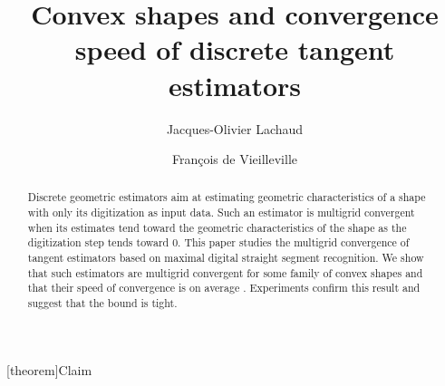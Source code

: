 \documentclass{llncs}
\begin{document}
\pagestyle{empty}

\mainmatter

\title{Convex shapes and convergence speed of discrete tangent estimators}

\author{Jacques-Olivier Lachaud  \and Fran\c{c}ois de Vieilleville}










\maketitle

\newcommand{\BigO}[1]{\ensuremath{ \mathcal{O}( #1 )}}
\newcommand{\DG}[0]{\ensuremath{\mathrm{Dig}}}
\newcommand{\Dig}[1]{\ensuremath{\DG_{#1}}}
\newcommand{\GDig}[1]{\ensuremath{\mathrm{D}^G_{#1}}}
\newcommand{\SF}[0]{\ensuremath{\mathbb{F}}}
\newcommand{\GQ}[0]{\ensuremath{G}} \newcommand{\DE}[1]{\ensuremath{\mathcal{#1}}} \newcommand{\Cite}[1]{\cite{#1}}
\newcommand{\CSF}[0]{\ensuremath{\mathbb{F}_{c}^3}}
\newcommand{\CSFM}[0]{\ensuremath{\mathbb{F}_{c}^3(M)}}
\newcommand{\Z}[0]{\ensuremath{\mathbb{Z}}}

\newcommand{\refClaim}[1]{Claim~\ref{#1}}
[theorem]{Claim}{\bfseries}{\itshape}

\newcommand{\TANEDGE}[1]{\ensuremath{\mathcal{T}^\mathrm{edge}_M}}
\newcommand{\TANMS}[1]{\ensuremath{\mathcal{T}^\mathrm{ms}_M}}

\begin{abstract}
  Discrete geometric estimators aim at estimating geometric
  characteristics of a shape with only its digitization as input data.
  Such an estimator is multigrid convergent when its estimates tend
  toward the geometric characteristics of the shape as the
  digitization step  tends toward 0.  This paper studies the
  multigrid convergence of tangent estimators based on maximal digital
  straight segment recognition. We show that such estimators are
  multigrid convergent for some family of convex shapes and that their
  speed of convergence is on average
  . Experiments confirm this result and
  suggest that the bound is tight.
\end{abstract}
\end{document}

